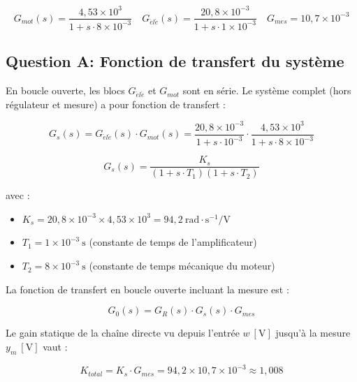 \documentclass[a4paper,5pt]{article}
\begin{document}
\begin{equation}
G_{mot}(s) = \frac{4{,}53 \times 10^{3}}{1 + s \cdot 8 \times 10^{-3}}
\quad
G_{\acute{e}l\acute{e}}(s) = \frac{20{,}8 \times 10^{-3}}{1 + s \cdot 1 \times 10^{-3}}
\quad
G_{mes} = 10{,}7 \times 10^{-3}
\end{equation}

\subsection{Question A: Fonction de transfert du système}

En boucle ouverte, les blocs $G_{\acute{e}l\acute{e}}$ et $G_{mot}$ sont en série.
Le système complet (hors régulateur et mesure) a pour fonction de transfert :

\begin{equation}
G_s(s) = G_{\acute{e}l\acute{e}}(s) \cdot G_{mot}(s)
= \frac{20{,}8 \times 10^{-3}}{1 + s \cdot 10^{-3}}
\cdot \frac{4{,}53 \times 10^{3}}{1 + s \cdot 8 \times 10^{-3}}
\end{equation}

\begin{equation}
G_s(s) = \frac{K_s}{(1 + s \cdot T_1)(1 + s \cdot T_2)}
\end{equation}

avec :
\begin{itemize}
\item $K_s = 20{,}8 \times 10^{-3} \times 4{,}53 \times 10^{3} = 94{,}2\ \mathrm{rad \cdot s^{-1}/V}$
\item $T_1 = 1 \times 10^{-3}\ \mathrm{s}$ \quad (constante de temps de l'amplificateur)
\item $T_2 = 8 \times 10^{-3}\ \mathrm{s}$ \quad (constante de temps mécanique du moteur)
\end{itemize}

La fonction de transfert en boucle ouverte incluant la mesure est :

\begin{equation}
G_0(s) = G_R(s) \cdot G_s(s) \cdot G_{mes}
\end{equation}

Le gain statique de la chaîne directe vu depuis l'entrée $w\ [\mathrm{V}]$ jusqu'à
la mesure $y_m\ [\mathrm{V}]$ vaut :

\begin{equation}
K_{total} = K_s \cdot G_{mes} = 94{,}2 \times 10{,}7 \times 10^{-3} \approx 1{,}008
\end{equation}
\end{document}
